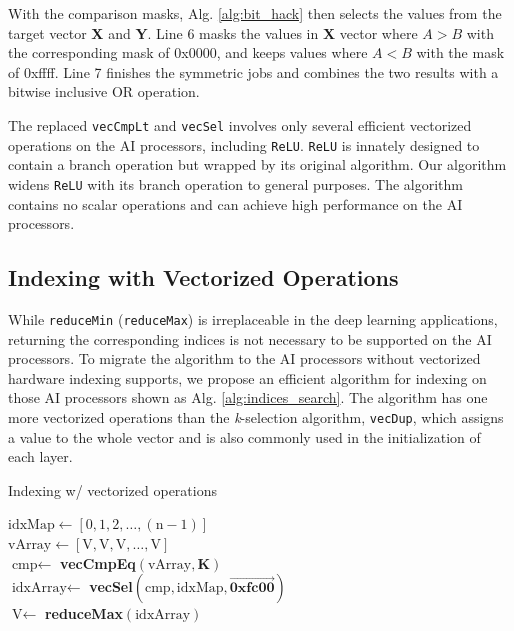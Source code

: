With the comparison masks, Alg. \ref{alg:bit_hack} then selects the values from the target vector \textbf{X} and \textbf{Y}. Line 6 masks the values in \textbf{X} vector where $A > B$ with the corresponding mask of 0x0000, and keeps values where $A < B$ with the mask of 0xffff. Line 7 finishes the symmetric jobs and combines the two results with a bitwise inclusive OR operation.

The replaced \verb|vecCmpLt| and \verb|vecSel| involves only several efficient vectorized operations on the AI processors, including \verb|ReLU|. \verb|ReLU| is innately designed to contain a branch operation but wrapped by its original algorithm. Our algorithm widens \verb|ReLU| with its branch operation to general purposes. The algorithm contains no scalar operations and can achieve high performance on the AI processors.

\subsection{Indexing with Vectorized Operations}

While \verb|reduceMin| (\verb|reduceMax|) is irreplaceable in the deep learning applications, returning the corresponding indices is not necessary to be supported on the AI processors. To migrate the algorithm to the AI processors without vectorized hardware indexing supports, we propose an efficient algorithm for indexing on those AI processors shown as Alg. \ref{alg:indices_search}. The algorithm has one more vectorized operations than the \textit{k}-selection algorithm, \verb|vecDup|, which assigns a value to the whole vector and is also commonly used in the initialization of each layer.

\begin{algorithm}[tbp]
    \caption{Indexing w/ vectorized operations}
    \label{alg:indices_search}
        
        
            
    \BlankLine
    
    $\text{idxMap} \leftarrow [0, 1, 2, \dots, (\text{n}-1)]$ \\
    $\text{vArray} \leftarrow [\text{V}, \text{V}, \text{V}, \dots, \text{V}]$ \\
    $\text{cmp} \leftarrow $ \textbf{vecCmpEq}$(\text{vArray}, \textbf{K})$  \\
    $\text{idxArray} \leftarrow $ \textbf{vecSel}$(\text{cmp}, \text{idxMap}, \vec{\textbf{0xfc00}})$ \\
    $\text{V} \leftarrow$ \textbf{reduceMax}$(\text{idxArray})$ \\
\end{algorithm}

